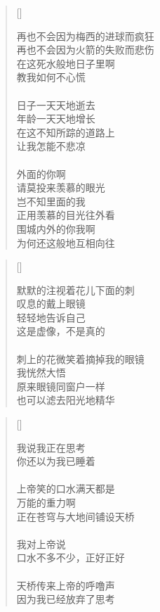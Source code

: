 \renewcommand{\poemtoc}{section}
\settowidth{\versewidth}{你的每一份努力}
\begin{verse}[\versewidth]

再也不会因为梅西的进球而疯狂\\
再也不会因为火箭的失败而悲伤\\
在这死水般地日子里啊\\
教我如何不心慌\\
~\\
日子一天天地逝去\\
年龄一天天地增长\\
在这不知所踪的道路上\\
让我怎能不悲凉\\
~\\
外面的你啊\\
请莫投来羡慕的眼光\\
岂不知里面的我\\
正用羡慕的目光往外看\\
围城内外的你我啊\\
为何还这般地互相向往
\end{verse}
\newpage

\renewcommand{\poemtoc}{section}
\settowidth{\versewidth}{昨夜我做了一个梦}
\begin{verse}[\versewidth]

默默的注视着花儿下面的刺\\
叹息的戴上眼镜\\
轻轻地告诉自己\\
这是虚像，不是真的\\
~\\
刺上的花微笑着摘掉我的眼镜\\
我恍然大悟\\
原来眼镜同窗户一样\\
也可以滤去阳光地精华\\
\end{verse}

\renewcommand{\poemtoc}{section}
\settowidth{\versewidth}{昨夜我做了一个梦}
\begin{verse}[\versewidth]

我说我正在思考\\
你还以为我已睡着\\
~\\
上帝笑的口水满天都是\\
万能的重力啊\\
正在苍穹与大地间铺设天桥\\
~\\
我对上帝说\\
口水不多不少，正好正好\\
~\\
天桥传来上帝的呼噜声\\
因为我已经放弃了思考
\end{verse}
\newpage


